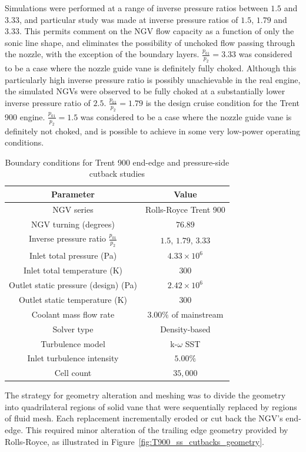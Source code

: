 \documentclass[a4paper, 11pt, oneside]{report}
\begin{document}
Simulations were performed at a range of inverse pressure ratios between $1.5$ and $3.33$, and particular study was made at inverse pressure ratios of $1.5$, $1.79$ and $3.33$. This permits comment on the NGV flow capacity as a function of only the sonic line shape, and eliminates the possibility of unchoked flow passing through the nozzle, with the exception of the boundary layers. $\frac{p_{01}}{p_2}=3.33$ was considered to be a case where the nozzle guide vane is definitely fully choked. Although this particularly high inverse pressure ratio is possibly unachievable in the real engine, the simulated NGVs were observed to be fully choked at a substantially lower inverse pressure ratio of $2.5$. $\frac{p_{01}}{p_2}=1.79$ is the design cruise condition for the Trent 900 engine. $\frac{p_{01}}{p_2}=1.5$ was considered to be a case where the nozzle guide vane is definitely not choked, and is possible to achieve in some very low-power operating conditions. 

\begin{table}[H]
\caption{Boundary conditions for Trent 900 end-edge and pressure-side cutback studies}
\label{ss_cutbacks_parameters}
\begin{center}
\begin{tabular}{|c|c|}
\hline
Parameter & Value\\
\hline
NGV series & Rolls-Royce Trent 900\\
NGV turning (degrees) & $76.89$\\
Inverse pressure ratio $\frac{p_{01}}{p_2}$ & $1.5$, $1.79$, $3.33$\\
Inlet total pressure (Pa) & $4.33 \times 10^6$\\
Inlet total temperature (K) & $300$\\
Outlet static pressure (design) (Pa) & $2.42 \times 10^6$\\
Outlet static temperature (K) & $300$\\
Coolant mass flow rate & $3.00\%$ of mainstream\\
Solver type & Density-based\\
Turbulence model & k-$\omega$ SST\\
Inlet turbulence intensity & $5.00\%$\\
Cell count & $35,000$\\
\hline
\end{tabular}
\end{center}
\end{table}

The strategy for geometry alteration and meshing was to divide the geometry into quadrilateral regions of solid vane that were sequentially replaced by regions of fluid mesh. Each replacement incrementally eroded or cut back the NGV's end-edge. This required minor alteration of the trailing edge geometry provided by Rolls-Royce, as illustrated in Figure~\ref{fig:T900_ss_cutbacks_geometry}.
\end{document}
